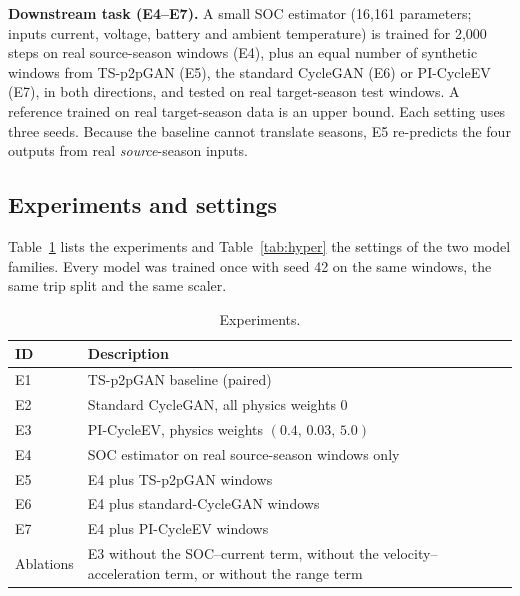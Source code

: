 \documentclass[conference]{IEEEtran}
\begin{document}
\textbf{Downstream task (E4--E7).} A small SOC estimator (16,161 parameters; inputs current, voltage, battery and ambient temperature) is trained for 2,000 steps on real source-season windows (E4), plus an equal number of synthetic windows from TS-p2pGAN (E5), the standard CycleGAN (E6) or PI-CycleEV (E7), in both directions, and tested on real target-season test windows. A reference trained on real target-season data is an upper bound. Each setting uses three seeds. Because the baseline cannot translate seasons, E5 re-predicts the four outputs from real \emph{source}-season inputs.


\subsection{Experiments and settings}
Table~\ref{tab:exps} lists the experiments and Table~\ref{tab:hyper} the settings of the two model families. Every model was trained once with seed 42 on the same windows, the same trip split and the same scaler.

\begin{table}[t]
\caption{Experiments.}
\label{tab:exps}
\centering\small
\setlength{\tabcolsep}{3pt}
\begin{tabular}{lp{6.2cm}}
\toprule
ID & Description\\
\midrule
E1 & TS-p2pGAN baseline (paired)\\
E2 & Standard CycleGAN, all physics weights 0\\
E3 & PI-CycleEV, physics weights $(0.4,\,0.03,\,5.0)$\\
E4 & SOC estimator on real source-season windows only\\
E5 & E4 plus TS-p2pGAN windows\\
E6 & E4 plus standard-CycleGAN windows\\
E7 & E4 plus PI-CycleEV windows\\
Ablations & E3 without the SOC--current term, without the velocity--acceleration term, or without the range term\\
\bottomrule
\end{tabular}
\end{table}
\end{document}

